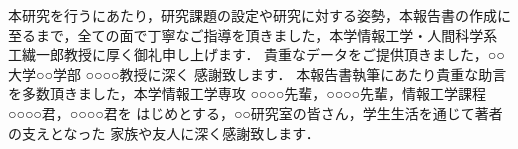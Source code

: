 \documentclass[main]{subfiles}
\begin{document}

\acknowledgement %
本研究を行うにあたり，研究課題の設定や研究に対する姿勢，本報告書の作成に
至るまで，全ての面で丁寧なご指導を頂きました，本学情報工学・人間科学系 
工繊一郎教授に厚く御礼申し上げます．
貴重なデータをご提供頂きました，○○大学○○学部 ○○○○教授に深く
感謝致します．
本報告書執筆にあたり貴重な助言を多数頂きました，本学情報工学専攻
 ○○○○先輩，○○○○先輩，情報工学課程 ○○○○君，○○○○君を
はじめとする，○○研究室の皆さん，学生生活を通じて著者の支えとなった
家族や友人に深く感謝致します．

\end{document}
